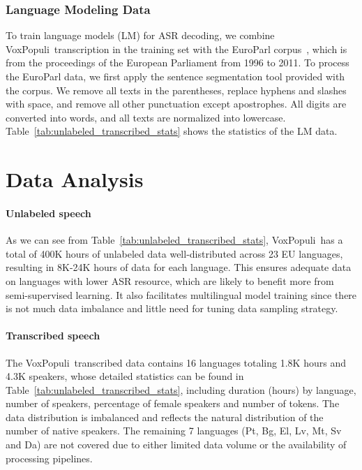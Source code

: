 \documentclass[11pt,a4paper]{article}
\newcommand{\vp}{VoxPopuli}
\begin{document}
\subsubsection{Language Modeling Data}
\label{sec:lm_data}
To train language models (LM) for ASR decoding, we combine \vp~transcription in the training set with the EuroParl corpus~\citep{koehn2005europarl}, which is from the proceedings of the European Parliament from 1996 to 2011. To process the EuroParl data, we first apply the sentence segmentation tool provided with the corpus. We remove all texts in the parentheses, replace hyphens and slashes with space, and remove all other punctuation except apostrophes. All digits are converted into words, and all texts are normalized into lowercase. Table~\ref{tab:unlabeled_transcribed_stats} shows the statistics of the LM data.


\section{Data Analysis}
\label{sec:data_analysis}

\paragraph{Unlabeled speech} As we can see from Table~\ref{tab:unlabeled_transcribed_stats}, \vp~has a total of 400K hours of unlabeled data well-distributed across 23 EU languages, resulting in 8K-24K hours of data for each language. This ensures adequate data on languages with lower ASR resource, which are likely to benefit more from semi-supervised learning. It also facilitates multilingual model training since there is not much data imbalance and little need for tuning data sampling strategy.

\paragraph{Transcribed speech} The \vp~transcribed data contains 16 languages totaling 1.8K hours and 4.3K speakers, whose detailed statistics can be found in Table~\ref{tab:unlabeled_transcribed_stats}, including duration (hours) by language, number of speakers, percentage of female speakers and number of tokens. The data distribution is imbalanced and reflects the natural distribution of the number of native speakers. The remaining 7 languages (Pt, Bg, El, Lv, Mt, Sv and Da) are not covered due to either limited data volume or the availability of processing pipelines.
\end{document}

